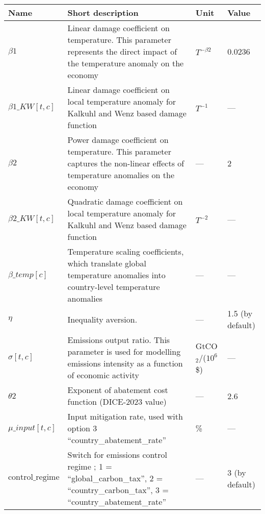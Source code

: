 \documentclass[
]{article}
\begin{document}
\renewcommand{\arraystretch}{1.5}
\begin{longtable}{|p{1.5in}|p{2.5in}|p{0.9in}|p{0.7in}|}
  \hline
  \textbf{Name} & \textbf{Short description} & \textbf{Unit} & \textbf{Value} \\
  \hline
  \endhead
  \(\beta1\) & Linear damage coefficient on temperature. This parameter represents the direct impact of the temperature anomaly on the economy & $T^{-\beta2}$ & 0.0236 \\
  \(\beta1\_{KW}[t,c]\) & Linear damage coefficient on local temperature anomaly for Kalkuhl and Wenz based damage function & $T^{-1}$ & — \\
  \(\beta2\) & Power damage coefficient on temperature. This parameter captures the non-linear effects of temperature anomalies on the economy & — & 2 \\
  \(\beta2\_{KW}[t,c]\) & Quadratic damage coefficient on local temperature anomaly for Kalkuhl and Wenz based damage function & $T^{-2}$ & — \\
  \(\beta\_{temp}[c]\) & Temperature scaling coefficients, which translate global temperature anomalies into country-level temperature anomalies & — & — \\
  \(\eta\) & Inequality aversion. & — & 1.5 (by default) \\
  \(\sigma[t,c]\) & Emissions output ratio. This parameter is used for modelling emissions intensity as a function of economic activity & GtCO$_2$/($10^6$ \$) & — \\
  \(\theta2\) & Exponent of abatement cost function (DICE-2023 value) & — & 2.6 \\
  \(\mu\_input[t,c]\) & Input mitigation rate, used with option 3 ``country\_abatement\_rate'' & \% & — \\
  \(\text{control\_regime}\) & Switch for emissions control regime ; 1 = ``global\_carbon\_tax'', 2 = ``country\_carbon\_tax'', 3 = ``country\_abatement\_rate'' & — & 3 (by default) \\


\end{longtable}
\end{document}
